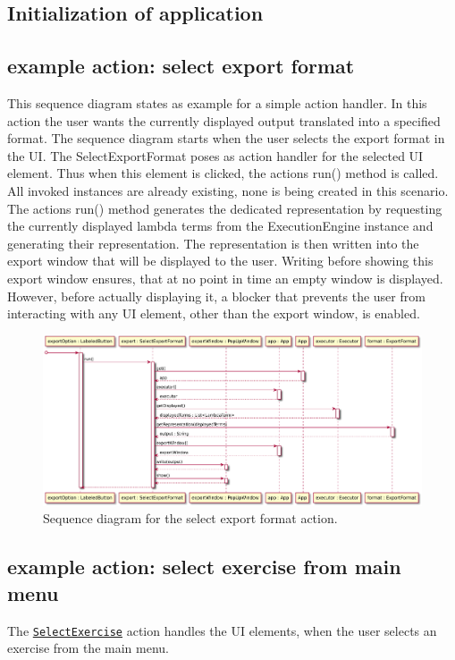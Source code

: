 \subsection{Initialization of application}

\subsection{example action: select export format}
This sequence diagram states as example for a simple action handler.
In this action the user wants the currently displayed output translated into a specified format. The sequence diagram starts when the user selects the export format in the UI. 
The SelectExportFormat poses as action handler for the selected UI element. Thus when this element is clicked, the actions run() method is called. All invoked instances are already existing, none is being created in this scenario.
The actions run() method generates the dedicated representation by requesting the currently displayed lambda terms from the ExecutionEngine instance and generating their representation.
The representation is then written into the export window that will be displayed to the user. Writing before showing this export window ensures, that at no point in time an empty window is displayed.
However, before actually displaying it, a blocker that prevents the user from interacting with any UI element, other than the export window, is enabled.

\begin{figure}[H]
	\centering
	\includegraphics[width=\textwidth]{sequenceDiagrams/exportOutput}
	\caption{Sequence diagram for the select export format action.}
\end{figure}

\subsection{example action: select exercise from main menu}
The \texttt{\hyperref[type:edu.kit.wavelength.client.view.action.SelectExercise]{SelectExercise}} 
action handles the UI elements, when the user selects an exercise from the main menu.

